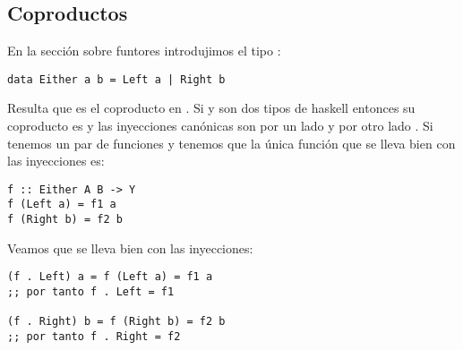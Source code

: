\subsection{Coproductos}
En la sección sobre funtores introdujimos el tipo :
\begin{verbatim}
data Either a b = Left a | Right b
\end{verbatim}
Resulta que  es el coproducto en . Si
 y  son dos tipos de haskell entonces su coproducto
es  y las inyecciones canónicas son por un lado
 y por otro lado
. Si tenemos un par de funciones
 y  tenemos que la única
función  que se lleva bien con las inyecciones
es:
\begin{verbatim}
f :: Either A B -> Y
f (Left a) = f1 a
f (Right b) = f2 b
\end{verbatim}

Veamos que se lleva bien con las inyecciones:
\begin{verbatim}
(f . Left) a = f (Left a) = f1 a
;; por tanto f . Left = f1

(f . Right) b = f (Right b) = f2 b
;; por tanto f . Right = f2
\end{verbatim}
